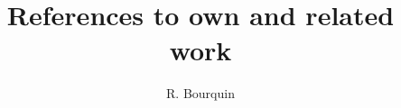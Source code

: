 \documentclass[a4paper,10pt]{article}
\title{References to own and related work}
\author{R. Bourquin}
\begin{document}
\maketitle

\nocite{*}



\end{document}
